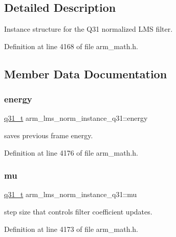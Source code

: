 \subsection{Detailed Description}
Instance structure for the Q31 normalized L\+MS filter. 

Definition at line 4168 of file arm\+\_\+math.\+h.



\subsection{Member Data Documentation}
\mbox{\label{structarm__lms__norm__instance__q31_a3c0ae42869afec8555dc8e3a7ef9b386}} 
\subsubsection{\texorpdfstring{energy}{energy}}
{\footnotesize\ttfamily \hyperlink{arm__math_8h_adc89a3547f5324b7b3b95adec3806bc0}{q31\+\_\+t} arm\+\_\+lms\+\_\+norm\+\_\+instance\+\_\+q31\+::energy}

saves previous frame energy. 

Definition at line 4176 of file arm\+\_\+math.\+h.

\mbox{\label{structarm__lms__norm__instance__q31_ad3dd2a2406e02fdaa7782ba6c3940a64}} 
\subsubsection{\texorpdfstring{mu}{mu}}
{\footnotesize\ttfamily \hyperlink{arm__math_8h_adc89a3547f5324b7b3b95adec3806bc0}{q31\+\_\+t} arm\+\_\+lms\+\_\+norm\+\_\+instance\+\_\+q31\+::mu}

step size that controls filter coefficient updates. 

Definition at line 4173 of file arm\+\_\+math.\+h.

\mbox{\label{structarm__lms__norm__instance__q31_a28e4c085af69c9c3e2e95dacf8004c3e}} 
